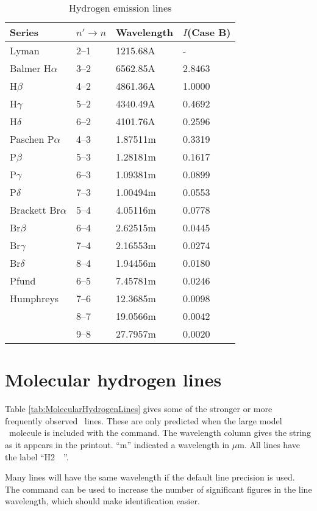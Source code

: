 \begin{table}
\centering
\caption{\label{tab:HydrogenEmissionLines}Hydrogen emission lines}
\begin{tabular}{llll}
\hline
Series& $n'\to n$& Wavelength& $I$(Case B)\\
\hline
Lyman& 2--1& 1215.68A& - \\
Balmer H$\alpha$& 3--2& 6562.85A     &2.8463\\
H$\beta$& 4--2& 4861.36A     &1.0000\\
H$\gamma$& 5--2& 4340.49A     &0.4692\\
H$\delta$& 6--2& 4101.76A     &0.2596\\
Paschen P$\alpha$& 4--3& 1.87511m   & 0.3319\\
P$\beta$& 5--3& 1.28181m    &0.1617\\
P$\gamma$& 6--3& 1.09381m    &0.0899\\
P$\delta$& 7--3& 1.00494m    &0.0553\\
Brackett Br$\alpha$& 5--4& 4.05116m &    0.0778\\
Br$\beta$& 6--4& 2.62515m&     0.0445\\
Br$\gamma$& 7--4& 2.16553m&     0.0274\\
Br$\delta$& 8--4& 1.94456m&     0.0180\\
Pfund& 6--5& 7.45781m& 0.0246\\
Humphreys& 7--6& 12.3685m& 0.0098\\
& 8--7& 19.0566m& 0.0042\\
& 9--8& 27.7957m& 0.0020\\
\hline
\end{tabular}
\end{table}

\section{Molecular hydrogen lines}

Table \ref{tab:MolecularHydrogenLines} gives some of the stronger
or more frequently observed \htwo\ lines.
These are only predicted when the large model \htwo\ molecule is
included with the  command.
The wavelength column gives the string
as it appears in the printout.  ``m'' indicated a wavelength in $\mu$m.
All lines have the label ``H2~~''.

Many lines will have the same wavelength if the default line precision is used.
The  command can be used 
to increase the number of significant figures in the
line wavelength, which should make identification easier.

